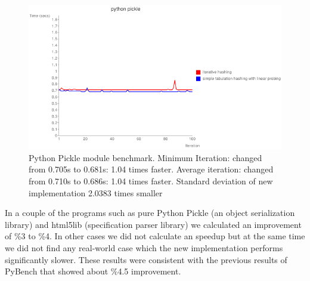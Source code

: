 \documentclass[11pt]{article}
\begin{document}
\begin{figure}[H]
  \centering
  \includegraphics[width=12cm]{slowpickle.png}
  \caption{Python Pickle module benchmark. Minimum Iteration: changed from 0.705s to 0.681s: 1.04 times faster. Average iteration: changed from 0.710s to 0.686s: 1.04 times faster. Standard deviation of new implementation 2.0383 times smaller}
\end{figure}



In a couple of the programs such as pure Python Pickle (an object serialization library) and html5lib (specification parser library) we calculated an improvement of \%3 to \%4. In other cases we did not calculate an speedup but at the same time we did not find any real-world case which the new implementation performs significantly slower. These results were consistent with the previous results of PyBench that showed about \%4.5 improvement.
 
\end{document}
